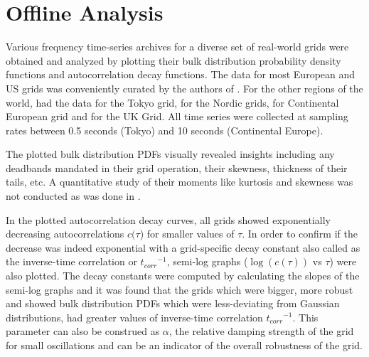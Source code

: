 \section[Offline/Postmortem Analysis]{Offline Analysis}
\label{sec:offline}

Various frequency time-series archives for a diverse set of real-world grids were obtained and analyzed by plotting their bulk distribution probability density functions and autocorrelation decay functions. The data for most European and US grids was conveniently curated by the authors of \cite{lrydin01, lrydinGithub}. For the other regions of the world, \cite{tokyo2017, tokyo2020} had the data for the Tokyo grid, \cite{nordic2018, nordic2019} for the Nordic grids, \cite{ce2019, ce2020} for Continental European grid and \cite{ukNationalGridESOData} for the UK Grid.
All time series were collected at sampling rates between 0.5 seconds (Tokyo) and 10 seconds (Continental Europe).

The plotted bulk distribution PDFs visually revealed insights including any deadbands \cite{francesca01, vorobev01} mandated in their grid operation, their skewness, thickness of their tails, etc. A quantitative study of their moments like kurtosis and skewness was not conducted as was done in \cite{schafer01}.

In the plotted autocorrelation decay curves, all grids showed exponentially decreasing autocorrelations $c(\tau$) for smaller values of $\tau$. In order to confirm if the decrease was indeed exponential with a grid-specific decay constant also called as the inverse-time correlation or ${t_{corr}}^{-1}$, semi-log graphs ($\log(c(\tau))$ vs $\tau$) were also plotted. The decay constants were computed by calculating the slopes of the semi-log graphs and it was found that the grids which were bigger, more robust and showed bulk distribution PDFs which were less-deviating from Gaussian distributions, had greater values of inverse-time correlation ${t_{corr}}^{-1}$. This parameter can also be construed as $\alpha$, the relative damping strength of the grid for small oscillations and can be an indicator of the overall robustness of the grid.